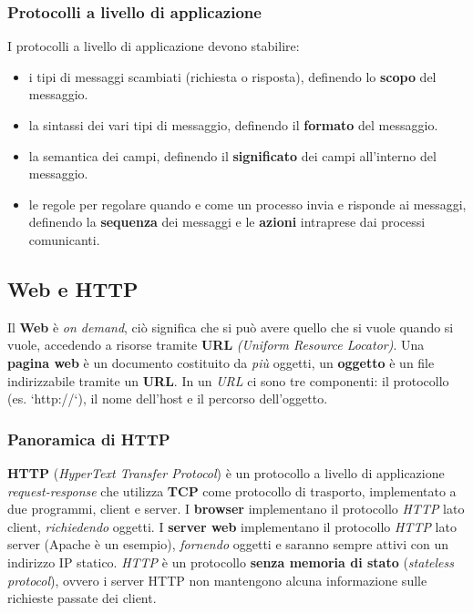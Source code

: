 \subsubsection{Protocolli a livello di applicazione}
I protocolli a livello di applicazione devono stabilire:
\begin{itemize}
\item i tipi di messaggi scambiati (richiesta o risposta), definendo lo \textbf{scopo} del messaggio.
\item la sintassi dei vari tipi di messaggio, definendo il \textbf{formato} del messaggio.
\item la semantica dei campi, definendo il \textbf{significato} dei campi all'interno del messaggio.
\item le regole per regolare quando e come un processo invia e risponde ai messaggi, definendo la \textbf{sequenza} dei messaggi e le \textbf{azioni} intraprese dai processi comunicanti.
\end{itemize}

\subsection{Web e HTTP}
Il \textbf{Web} è \textit{on demand}, ciò significa che si può avere quello che si vuole quando si vuole, accedendo a risorse tramite \textbf{URL} \textit{(Uniform Resource Locator)}.
Una \textbf{pagina web} è un documento costituito da \textit{più} oggetti, un \textbf{oggetto} è un file indirizzabile tramite un \textbf{URL}.
In un \textit{URL} ci sono tre componenti: il protocollo (es. `http://`), il nome dell'host e il percorso dell'oggetto.

\subsubsection{Panoramica di HTTP}
\textbf{HTTP} (\textit{HyperText Transfer Protocol}) è un protocollo a livello di applicazione \textit{request-response} che utilizza \textbf{TCP} come protocollo di trasporto, implementato a due programmi, client e server.
I \textbf{browser} implementano il protocollo \textit{HTTP} lato client, \textit{richiedendo} oggetti.
I \textbf{server web} implementano il protocollo \textit{HTTP} lato server (Apache è un esempio), \textit{fornendo} oggetti e saranno sempre attivi con un indirizzo IP statico.
\textit{HTTP} è un protocollo \textbf{senza memoria di stato} (\textit{stateless protocol}), ovvero i server HTTP non mantengono alcuna informazione sulle richieste passate dei client.

